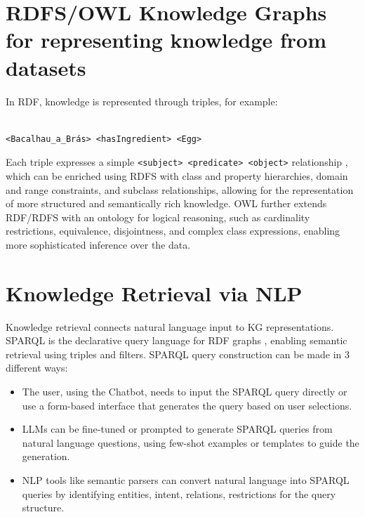 \documentclass[conference]{IEEEtran}
\begin{document}
  




\section{RDFS/OWL Knowledge Graphs for representing knowledge from datasets}
\noindent
In RDF, knowledge is represented through triples, for example:

\begin{verbatim}

<Bacalhau_a_Brás> <hasIngredient> <Egg>

\end{verbatim}
\noindent
Each triple expresses a simple \texttt{<subject> <predicate> <object>} relationship \cite{semanticweb2024slides}, which can be enriched using RDFS with class and property hierarchies, domain and range constraints, and subclass relationships, allowing for the representation of more structured and semantically rich knowledge. OWL further extends RDF/RDFS with an ontology for logical reasoning, such as cardinality restrictions, equivalence, disjointness, and complex class expressions, enabling more sophisticated inference over the data.


\section{Knowledge Retrieval via NLP}
\noindent
Knowledge retrieval connects natural language input to KG representations. SPARQL is the declarative query language for RDF graphs \cite{semanticweb2024slides}, enabling semantic retrieval using triples and filters.
SPARQL query construction can be made in 3 different ways:
\begin{itemize}
    \item The user, using the Chatbot, needs to input the SPARQL query directly or use a form-based interface that generates the query based on user selections.
    \item LLMs can be fine-tuned or prompted to generate SPARQL queries from natural language questions, using few-shot examples or templates to guide the generation.
    \item NLP tools like semantic parsers can convert natural language into SPARQL queries by identifying entities, intent, relations, restrictions for the query structure.
\end{itemize}
\end{document}
